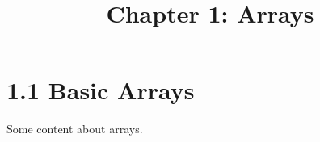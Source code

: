 \documentclass{article}
\title{Chapter 1: Arrays}
\begin{document}
\section{1.1 Basic Arrays}
Some content about arrays.
\end{document}
